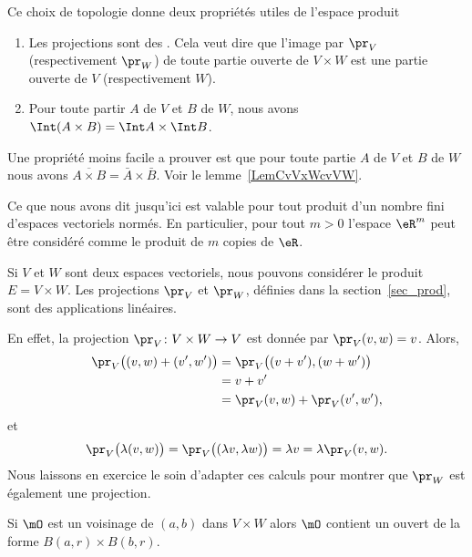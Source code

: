 Ce choix de topologie donne deux propriétés utiles de l'espace produit
\begin{enumerate}
	\item
		Les projections sont des . Cela veut dire que l'image par $\pr_V$ (respectivement $\pr_W$) de toute partie ouverte de $V\times W$ est une partie ouverte de $V$ (respectivement $W$).
	\item
		Pour toute partir $A$ de $V$ et $B$ de $W$, nous avons $\Int (A\times B)=\Int A\times \Int B$.\label{PgovlABeqbAbB}
\end{enumerate}
Une propriété moins facile a prouver est que pour toute partie $A$ de $V$ et $B$ de $W$ nous avons  $\overline{A\times B}=\bar{A}\times \bar{B}$. Voir le lemme~\ref{LemCvVxWcvVW}.

Ce que nous avons dit jusqu'ici est valable pour tout produit d'un nombre fini d'espaces vectoriels normés. En particulier, pour tout $m>0$  l'espace  $\eR^m$ peut être considéré comme le produit de $m$ copies de $\eR$.

\begin{example}
	Si $V$ et $W$ sont deux espaces vectoriels, nous pouvons considérer le produit $E=V\times W$. Les projections $\pr_V$ et $\pr_W$, définies dans la section~\ref{sec_prod}, sont des applications linéaires.

	En effet, la projection $\pr_V\colon V\times W\to V$ est donnée par $\pr_V(v,w)=v$. Alors,
	\begin{equation}
		\begin{aligned}[]
			\pr_V\big( (v,w)+(v',w') \big)&=\pr_V\big( (v+v'),(w+w') \big)\\
			&=v+v'\\
			&=\pr_V(v,w)+\pr_V(v',w'),
		\end{aligned}
	\end{equation}
	et
	\begin{equation}
		\pr_V\big( \lambda(v,w) \big)=\pr_V\big( (\lambda v,\lambda w) \big)=\lambda v=\lambda\pr_V(v,w).
	\end{equation}
	Nous laissons en exercice le soin d'adapter ces calculs pour montrer que $\pr_W$ est également une projection.
\end{example}

\begin{proposition} \label{PropDXR_KbaLC}
    Si \( \mO\) est un voisinage de \( (a,b)\) dans \( V\times W\) alors \( \mO\) contient un ouvert de la forme \( B(a,r)\times B(b,r)\).
\end{proposition}

